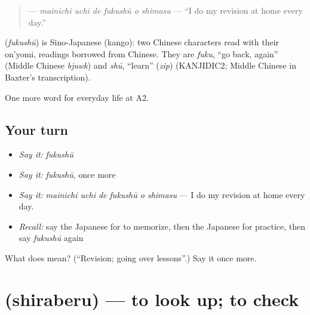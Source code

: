 \begin{quote}
\textbf{   } — \emph{mainichi uchi de fukushū o shimasu} — \textquotedblleft{}I do my revision at home every day.\textquotedblright{}
\end{quote}

\begin{cousinweb}
\textbf{} (\emph{fukushū}) is Sino-Japanese (kango): two Chinese characters read with their on'yomi, readings borrowed from Chinese. They are \emph{fuku}, \textquotedblleft{}go back, again\textquotedblright{} (Middle Chinese \emph{bjuwk}) and \emph{shū}, \textquotedblleft{}learn\textquotedblright{} (\emph{zip}) (KANJIDIC2; Middle Chinese in Baxter's transcription).
\end{cousinweb}

\begin{grammarlens}[title={What you've built}]
One more word for everyday life at A2.
\end{grammarlens}

\subsection*{Your turn}
\begin{itemize}
\raggedright
  \item \emph{Say it:} \emph{fukushū}
  \item \emph{Say it:} \emph{fukushū}, once more
  \item \emph{Say it:} \emph{mainichi uchi de fukushū o shimasu} — I do my revision at home every day.
  \item \emph{Recall:} say the Japanese for to memorize, then the Japanese for practice, then say \emph{fukushū} again
\end{itemize}

\begin{tcolorbox}[breakable,colback=teal!4,colframe=teal!35!black,title={Before you move on}]
What does  mean? (\textquotedblleft{}Revision; going over lessons\textquotedblright{}.) Say it once more.
\end{tcolorbox}
\section[\texorpdfstring{\ja{しらべる} (shiraberu)}{しらべる (shiraberu)}]{ (shiraberu) — to look up; to check}

\label{lesson:JA-C225-shiraberu}



